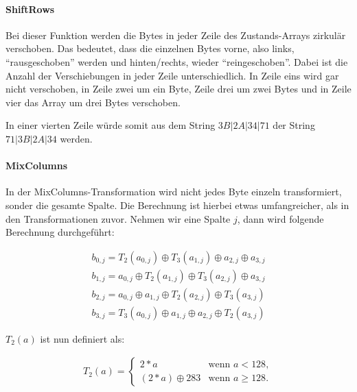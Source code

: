   \paragraph{ShiftRows}
   Bei dieser Funktion werden die Bytes in jeder Zeile des Zustands-Arrays zirkulär verschoben. Das bedeutet,
   dass die einzelnen Bytes vorne, also links, ``rausgeschoben'' werden und hinten/rechts, wieder
   ``reingeschoben''. Dabei ist  die Anzahl der Verschiebungen in jeder Zeile unterschiedlich. In Zeile eins wird
   gar nicht verschoben, in Zeile zwei um ein Byte, Zeile drei um zwei Bytes und in Zeile vier das Array um drei
   Bytes verschoben.
   
   In einer vierten Zeile würde somit aus dem String $3B | 2A | 34 | 71$ der String $71 | 3B | 2A | 34$ werden.
   
  \paragraph{MixColumns}
   In der MixColumns-Transformation wird nicht jedes Byte einzeln transformiert, sonder die gesamte Spalte.
   Die Berechnung ist hierbei etwas umfangreicher, als in den Transformationen zuvor. Nehmen wir eine Spalte
   $j$, dann wird folgende Berechnung durchgeführt:
   
    \begin{equation*}
     \begin{split}
     b_{0,j} = T_2(a_{0,j}) \oplus T_3(a_{1,j}) \oplus a_{2,j} \oplus a_{3,j} \\
     b_{1,j} = a_{0,j} \oplus T_2(a_{1,j}) \oplus T_3(a_{2,j}) \oplus a_{3,j} \\
     b_{2,j} = a_{0,j} \oplus a_{1,j} \oplus T_2(a_{2,j}) \oplus T_3(a_{3,j}) \\
     b_{3,j} = T_3(a_{0,j}) \oplus a_{1,j} \oplus a_{2,j} \oplus T_2(a_{3,j})
     \end{split}
    \end{equation*}
    
    $T_2(a)$ ist nun definiert als:
    
    \begin{equation*}
     \begin{aligned}
     T_2(a) = \begin{cases}
      2 * a 		 & \text{wenn $a < 128$},\\
      (2*a) \oplus 283 & \text{wenn $a \geq 128$}.
     \end{cases}
     \end{aligned}
    \end{equation*}
    
